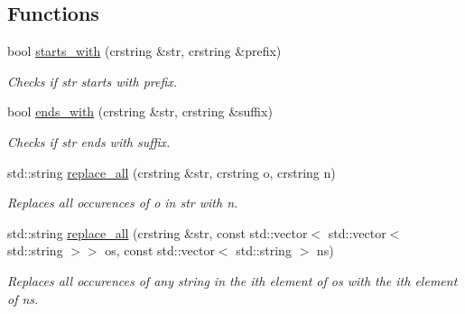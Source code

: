 \subsection*{Functions}
\begin{DoxyCompactItemize}
\item 
\mbox{\label{namespacenta_1_1utils_a65417325ced7ca31805371e5e8889b86}} 
bool \hyperlink{namespacenta_1_1utils_a65417325ced7ca31805371e5e8889b86}{starts\+\_\+with} (crstring \&str, crstring \&prefix)
\begin{DoxyCompactList}\small\item\em Checks if str starts with prefix. \end{DoxyCompactList}\item 
\mbox{\label{namespacenta_1_1utils_a71ea428a0cd179df64635ef777ecd1a7}} 
bool \hyperlink{namespacenta_1_1utils_a71ea428a0cd179df64635ef777ecd1a7}{ends\+\_\+with} (crstring \&str, crstring \&suffix)
\begin{DoxyCompactList}\small\item\em Checks if str ends with suffix. \end{DoxyCompactList}\item 
\mbox{\label{namespacenta_1_1utils_a04883317019161c3523593fe4d24fb70}} 
std\+::string \hyperlink{namespacenta_1_1utils_a04883317019161c3523593fe4d24fb70}{replace\+\_\+all} (crstring \&str, crstring o, crstring n)
\begin{DoxyCompactList}\small\item\em Replaces all occurences of o in str with n. \end{DoxyCompactList}\item 
\mbox{\label{namespacenta_1_1utils_a6f91d1e6e23da9220fe9556685b89c19}} 
std\+::string \hyperlink{namespacenta_1_1utils_a6f91d1e6e23da9220fe9556685b89c19}{replace\+\_\+all} (crstring \&str, const std\+::vector$<$ std\+::vector$<$ std\+::string $>$$>$ os, const std\+::vector$<$ std\+::string $>$ ns)
\begin{DoxyCompactList}\small\item\em Replaces all occurences of any string in the ith element of os with the ith element of ns. \end{DoxyCompactList}\item 
\mbox{\label{namespacenta_1_1utils_a9b119483690a21ce86d99d61106ee412}} 
$$
\end{DoxyCompactItemize}
